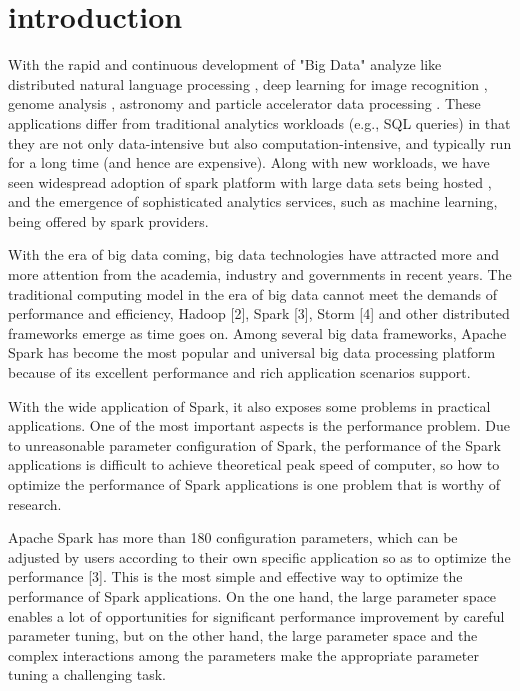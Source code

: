 \section{introduction}
\par With the rapid and continuous development of "Big Data" analyze like distributed natural language processing \cite{wang2011openflow}, deep learning for image recognition \cite{wang2011openflow}, genome analysis \cite{wang2011openflow}, astronomy \cite{wang2011openflow} and particle accelerator data processing \cite{wang2011openflow}. These applications differ from traditional analytics workloads (e.g., SQL queries) in that they are not only data-intensive but also computation-intensive, and typically run for a long time (and hence are expensive). Along with new workloads, we have seen widespread adoption of spark platform with large data sets being hosted \cite{wang2011openflow}, and the emergence of sophisticated analytics services, such as machine learning, being offered by spark providers\cite{wang2011openflow}.

\par With the era of big data coming, big data technologies have attracted more and more attention from the academia, industry and governments in recent years. The traditional computing model in the era of big data cannot meet the demands of performance and efficiency, Hadoop [2], Spark [3], Storm [4] and other distributed frameworks emerge as time goes on. Among several big data frameworks, Apache Spark has become the most popular and universal big data processing platform because of its excellent performance and rich application scenarios support.

\par With the wide application of Spark, it also exposes some problems in practical applications. One of the most important aspects is the performance problem. Due to unreasonable parameter configuration of Spark, the performance of the Spark applications is difficult to achieve theoretical peak speed of computer, so how to optimize the performance of Spark applications is one problem that is worthy of research.

\par Apache Spark has more than 180 configuration parameters, which can be adjusted by users according to their own specific application so as to optimize the performance [3]. This is the most simple and effective way to optimize the performance of Spark applications. On the one hand, the large parameter space enables a lot of opportunities for significant performance improvement by careful parameter tuning, but on the other hand, the large parameter space and the complex interactions among the parameters make the appropriate parameter tuning a challenging task.

